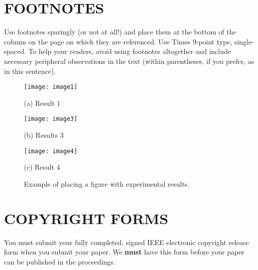 \documentclass{article}
\begin{document}
\section{FOOTNOTES}
\label{sec:foot}

Use footnotes sparingly (or not at all!) and place them at the bottom of the
column on the page on which they are referenced. Use Times 9-point type,
single-spaced. To help your readers, avoid using footnotes altogether and
include necessary peripheral observations in the text (within parentheses, if
you prefer, as in this sentence).

\begin{figure}[htb]

\begin{minipage}[b]{1.0\linewidth}
 \centering
 \centerline{\texttt{[image: image1]}}
\centerline{(a) Result 1}\medskip
\end{minipage}
\begin{minipage}[b]{.48\linewidth}
 \centering
 \centerline{\texttt{[image: image3]}}
\centerline{(b) Results 3}\medskip
\end{minipage}
\hfill
\begin{minipage}[b]{0.48\linewidth}
 \centering
 \centerline{\texttt{[image: image4]}}
\centerline{(c) Result 4}\medskip
\end{minipage}
\caption{Example of placing a figure with experimental results.}
\label{fig:res}
\end{figure}



\section{COPYRIGHT FORMS}
\label{sec:copyright}

You must submit your fully completed, signed IEEE electronic copyright release
form when you submit your paper. We {\bf must} have this form before your paper
can be published in the proceedings.

\fi
\end{document}
